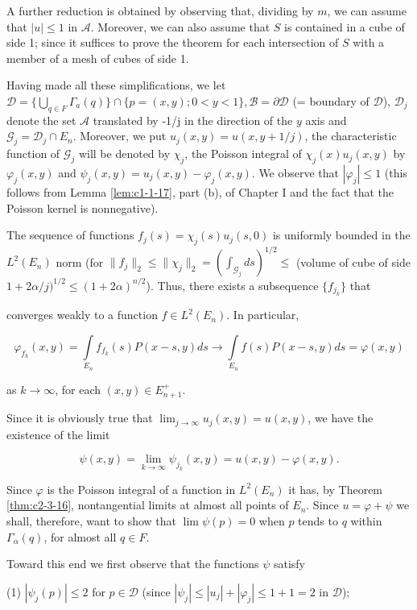 A further reduction is obtained by observing that, dividing by $m$, we can assume that $|u| \leq 1$ in $\mathcal{A}$. Moreover, we can also assume that $S$ is contained in a cube of side 1; since it suffices to prove the theorem for each intersection of $S$ with a member of a mesh of cubes of side 1.

Having made all these simplifications, we let $\mathcal{D} = \{\bigcup_{q \in F} \Gamma_a(q)\} \cap \{p = (x, y); 0 < y < 1\}, \mathcal{B} = \partial \mathcal{D}$ (= boundary of $\mathcal{D}$), $\mathcal{D}_j$ denote the set $\mathcal{A}$ translated by -1/j in the direction of the $y$ axis and $\mathcal{G}_j = \mathcal{D}_j \cap E_n$. Moreover, we put $u_j(x, y) = u(x, y + 1/j)$, the characteristic function of $\mathcal{G}_j$ will be denoted by $\chi_j$, the Poisson integral of $\chi_j(x)u_j(x, y)$ by $\varphi_j(x, y)$ and $\psi_j(x, y) = u_j(x, y) - \varphi_j(x, y)$. We observe that $|\varphi_j| \leq 1$ (this follows from Lemma \ref{lem:c1-1-17}, part (b), of Chapter I and the fact that the Poisson kernel is nonnegative).

The sequence of functions $f_j(s) = \chi_j(s)u_j(s, 0)$ is uniformly bounded in the $L^2(E_n)$ norm (for $\|f_j\|_2 \leq \|\chi_j\|_2 = (\int_{\mathcal{G}_j} ds)^{1/2} \leq$ (volume of cube of side $1 + 2\alpha/j)^{1/2} \leq (1 + 2\alpha)^{n/2}$). Thus, there exists a subsequence $\{f_{j_k}\}$ that

converges weakly to a function $f \in L^2(E_n)$. In particular,

\[
\varphi_{f_{k}}(x,y)=\int\limits_{E_{n}}f_{f_{k}}(s)P(x-s,y)ds\to\int\limits_{E_{n}}f(s)P(x-s,y)ds=\varphi(x,y)
\]

as $k \to \infty$, for each $(x, y) \in E_{n+1}^+$.

Since it is obviously true that $\lim_{j\to\infty}u_{j}(x,y)=u(x,y)$, we have the existence of the limit

\[
\psi(x,y)=\lim_{k\to\infty}\psi_{j_{k}}(x,y)=u(x,y)-\varphi(x,y).
\]

Since $\varphi$ is the Poisson integral of a function in $L^{2}(E_{n})$ it has, by Theorem \ref{thm:c2-3-16}, nontangential limits at almost all points of $E_{n}$. Since $u = \varphi + \psi$ we shall, therefore, want to show that $\lim \psi(p) = 0$ when $p$ tends to $q$ within $\Gamma_{\alpha}(q)$, for almost all $q \in F$.

Toward this end we first observe that the functions $\psi$ satisfy

(1) $|\psi_j(p)| \leq 2$ for $p \in \mathcal{D}$ (since $|\psi_j| \leq |u_j| + |\varphi_j| \leq 1 + 1 = 2$ in $\mathcal{D}$);

